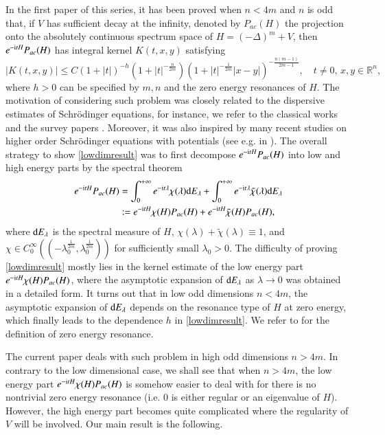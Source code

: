 \documentclass[11pt,reqno]{amsart}
\def\d{{\rm d}}
\def\i{{\rm i}}
\numberwithin{equation}{section}
\theoremstyle{definition}
\begin{document}
In the first paper \cite{CHHZ} of this series, it has been proved when $n<4m$ and $n$ is odd that, if $V$ has sufficient decay at the infinity, denoted by $P_{ac}(H)$ the projection onto the absolutely continuous spectrum space of $H=(-\Delta)^m+V$, then $e^{-\i tH}P_{ac}(H)$ has integral kernel $K(t,x,y)$ satisfying
\begin{equation}\label{lowdimresult}
	|K(t, x,y)|\le C(1+|t|)^{-h}(1+|t|^{-\frac{n}{2 m}})\left(1+|t|^{-\frac{1}{2 m}}|x-y|\right)^{-\frac{n(m-1)}{2 m-1}},\quad t\neq0,\,x,y\in\mathbb{R}^n,
\end{equation}
where $h>0$ can be specified by $m,n$ and the zero energy resonances of $H$. The motivation of considering such problem was closely related to the  dispersive estimates of Schr\"{o}dinger equations, for instance, we refer to the  classical  works \cite{JSS,Ya,RS} and the survey papers \cite{Sch07,Sch21}. Moreover, it was also inspired by many recent studies on  higher order Schr\"{o}dinger equations with potentials (see e.g. in \cite{FSY,FSWY,EG22,EGG231,EG23,EGT,EGL,EGG23,GY,GT19,GG21,MWY}). The overall strategy to show \eqref{lowdimresult} was to first decompose $e^{-\i tH}P_{ac}(H)$ into low and high energy parts by the spectral theorem
\begin{equation}\label{split}
	\begin{split}
		e^{-\i tH}P_{ac}(H)&=\int_0^{+\infty}e^{-\i t\lambda}\chi(\lambda)\d E_\lambda+\int_0^{+\infty}e^{-\i t\lambda}\tilde{\chi}(\lambda)\d E_\lambda\\
		&:=e^{-\i tH}\chi(H)P_{ac}(H)+e^{-\i tH}\tilde{\chi}(H)P_{ac}(H),
	\end{split}
\end{equation}
where $\d E_\lambda$ is the spectral measure of $H$, $\chi(\lambda)+\tilde{\chi}(\lambda)\equiv1$, and $\chi\in C_0^\infty((-\lambda_0^\frac{1}{2m},\lambda_0^\frac{1}{2m}))$ for sufficiently small $\lambda_0>0$. The difficulty of proving \eqref{lowdimresult} mostly lies in the kernel estimate of the low energy part $e^{-\i tH}\chi(H)P_{ac}(H)$, where the asymptotic expansion of $\d E_\lambda$ as $\lambda\rightarrow0$ was obtained in a detailed form. It turns out that in low odd dimensions $n<4m$, the asymptotic expansion of $\d E_\lambda$ depends on the resonance type of $H$ at zero energy, which finally leads to the dependence $h$ in \eqref{lowdimresult}. We refer to \cite{CHHZ} for the definition of zero energy resonance.

The current paper deals with such problem in high odd dimensions $n>4m$. In contrary to the low dimensional case, we shall see that when $n>4m$, the low energy part $e^{-\i tH}\chi(H)P_{ac}(H)$ is somehow easier to deal with for there is no nontrivial zero energy resonance (i.e. $0$ is either regular or an eigenvalue of $H$). However, the high energy part becomes quite complicated where the regularity of $V$ will be involved. Our main result is the following.
\end{document}
